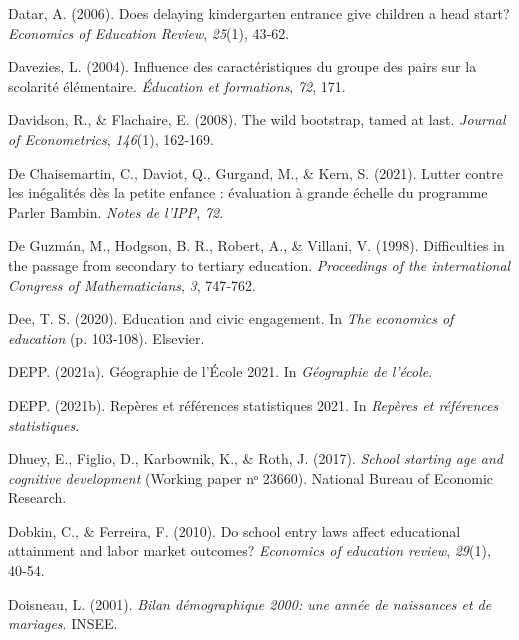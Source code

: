 \documentclass[
]{book}
\newlength{\cslhangindent}
\newlength{\cslentryspacingunit} %
\newenvironment{CSLReferences}[2] %
 {%
  \setlength{\parindent}{0pt}
  \ifodd #1
  \let\oldpar\par
  \def\par{\hangindent=\cslhangindent\oldpar}
  \fi
  \setlength{\parskip}{#2\cslentryspacingunit}
 }%
 {}
\begin{document}
\begin{CSLReferences}{1}{2}
\leavevmode{}%
Datar, A. (2006). Does delaying kindergarten entrance give children a head start? \emph{Economics of Education Review}, \emph{25}(1), 43‑62.

\leavevmode{}%
Davezies, L. (2004). Influence des caract{é}ristiques du groupe des pairs sur la scolarit{é} {é}l{é}mentaire. \emph{{É}ducation et formations}, \emph{72}, 171.

\leavevmode{}%
Davidson, R., \& Flachaire, E. (2008). The wild bootstrap, tamed at last. \emph{Journal of Econometrics}, \emph{146}(1), 162‑169.

\leavevmode{}%
De Chaisemartin, C., Daviot, Q., Gurgand, M., \& Kern, S. (2021). Lutter contre les in{é}galit{é}s d{è}s la petite enfance : {é}valuation {à} grande {é}chelle du programme Parler Bambin. \emph{Notes de l'IPP}, \emph{72}.

\leavevmode{}%
De Guzmán, M., Hodgson, B. R., Robert, A., \& Villani, V. (1998). Difficulties in the passage from secondary to tertiary education. \emph{Proceedings of the international Congress of Mathematicians}, \emph{3}, 747‑762.

\leavevmode{}%
Dee, T. S. (2020). Education and civic engagement. In \emph{The economics of education} (p. 103‑108). Elsevier.

\leavevmode{}%
DEPP. (2021a). Géographie de l'École 2021. In \emph{Géographie de l'école}.

\leavevmode{}%
DEPP. (2021b). Repères et références statistiques 2021. In \emph{Repères et références statistiques}.

\leavevmode{}%
Dhuey, E., Figlio, D., Karbownik, K., \& Roth, J. (2017). \emph{School starting age and cognitive development} (Working paper nᵒ 23660). National Bureau of Economic Research.

\leavevmode{}%
Dobkin, C., \& Ferreira, F. (2010). Do school entry laws affect educational attainment and labor market outcomes? \emph{Economics of education review}, \emph{29}(1), 40‑54.

\leavevmode{}%
Doisneau, L. (2001). \emph{Bilan d{é}mographique 2000: une ann{é}e de naissances et de mariages}. INSEE.


\end{CSLReferences}
\end{document}
